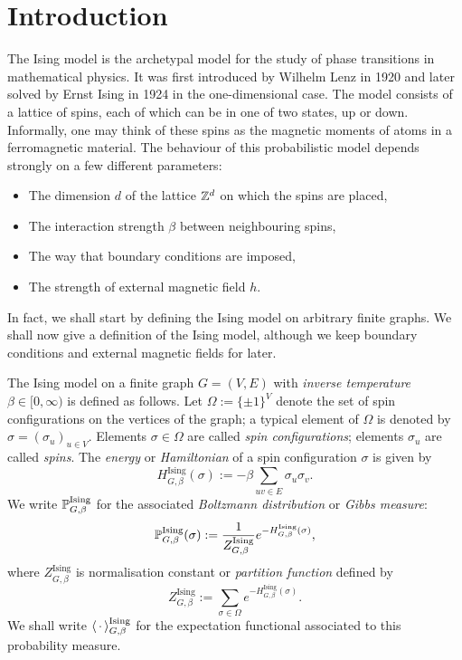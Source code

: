 \section{Introduction}
\label{sec:intro}

The Ising model is the archetypal model for the study of phase transitions in
mathematical physics.
It was first introduced by Wilhelm Lenz in 1920 and later solved by Ernst Ising
in 1924 in the one-dimensional case.
The model consists of a lattice of spins,
each of which can be in one of two states,
up or down.
Informally,
one may think of these spins as the magnetic moments of atoms in a ferromagnetic material.
The behaviour of this probabilistic model depends strongly on a few different parameters:
\begin{itemize}
    \item The dimension $d$ of the lattice $\Z^d$ on which the spins are placed,
    \item The interaction strength $\beta$ between neighbouring spins,
    \item The way that boundary conditions are imposed,
    \item The strength of external magnetic field $h$.
\end{itemize}
In fact, we shall start by defining the Ising model on arbitrary finite graphs.
We shall now give a definition of the Ising model, although
we keep boundary conditions and external magnetic fields for later.

\begin{definition}
    \label{def:ising_finite}
    The Ising model on a finite graph \( G = (V, E) \) with \emph{inverse temperature} \( \beta \in [0,\infty) \) is defined as follows.
    Let $\Omega:=\{\pm1\}^V$ denote the set of spin configurations on the vertices of the graph;
    a typical element of $\Omega$ is denoted by $\sigma=(\sigma_u)_{u\in V}$.
    Elements $\sigma\in\Omega$ are called \emph{spin configurations};
    elements $\sigma_u$ are called \emph{spins}.
    The \emph{energy} or \emph{Hamiltonian} of a spin configuration $\sigma$ is given by
    \[
        H_{G,\beta}^{\operatorname{Ising}}(\sigma) := -\beta \sum_{uv \in E} \sigma_u \sigma_v.
    \]
    We write $\P_{G,\beta}^{\operatorname{Ising}}$ for the associated \emph{Boltzmann distribution} or \emph{Gibbs measure}:
    \[
        \P_{G,\beta}^{\operatorname{Ising}}(\sigma) := \frac{1}{Z_{G,\beta}^{\operatorname{Ising}}} e^{-H^{\operatorname{Ising}}_{G,\beta}(\sigma)},
    \]
    where \(Z_{G,\beta}^{\operatorname{Ising}}\) is normalisation constant or \emph{partition function} defined by
    \[
        Z_{G,\beta}^{\operatorname{Ising}}:= \sum_{\sigma\in\Omega} e^{-H^{\operatorname{Ising}}_{G,\beta}(\sigma)}.
    \]
    We shall write $\langle\blank\rangle_{G,\beta}^{\operatorname{Ising}}$ for the expectation functional associated to this probability measure.
\end{definition}

